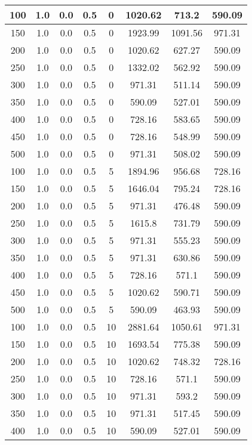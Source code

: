 \documentclass[a4paper, 12pt]{extreport}
\begin{document}
\begin{itemize}
\begin{longtable}{|c|c|c|c|c|c|c|c|}
			100 & 1.0 & 0.0 & 0.5 & 0 & 1020.62 & 713.2 & 590.09 \\\hline
			150 & 1.0 & 0.0 & 0.5 & 0 & 1923.99 & 1091.56 & 971.31 \\\hline
			200 & 1.0 & 0.0 & 0.5 & 0 & 1020.62 & 627.27 & 590.09 \\\hline
			250 & 1.0 & 0.0 & 0.5 & 0 & 1332.02 & 562.92 & 590.09 \\\hline
			300 & 1.0 & 0.0 & 0.5 & 0 & 971.31 & 511.14 & 590.09 \\\hline
			350 & 1.0 & 0.0 & 0.5 & 0 & 590.09 & 527.01 & 590.09 \\\hline
			400 & 1.0 & 0.0 & 0.5 & 0 & 728.16 & 583.65 & 590.09 \\\hline
			450 & 1.0 & 0.0 & 0.5 & 0 & 728.16 & 548.99 & 590.09 \\\hline
			500 & 1.0 & 0.0 & 0.5 & 0 & 971.31 & 508.02 & 590.09 \\\hline
			100 & 1.0 & 0.0 & 0.5 & 5 & 1894.96 & 956.68 & 728.16 \\\hline
			150 & 1.0 & 0.0 & 0.5 & 5 & 1646.04 & 795.24 & 728.16 \\\hline
			200 & 1.0 & 0.0 & 0.5 & 5 & 971.31 & 476.48 & 590.09 \\\hline
			250 & 1.0 & 0.0 & 0.5 & 5 & 1615.8 & 731.79 & 590.09 \\\hline
			300 & 1.0 & 0.0 & 0.5 & 5 & 971.31 & 555.23 & 590.09 \\\hline
			350 & 1.0 & 0.0 & 0.5 & 5 & 971.31 & 630.86 & 590.09 \\\hline
			400 & 1.0 & 0.0 & 0.5 & 5 & 728.16 & 571.1 & 590.09 \\\hline
			450 & 1.0 & 0.0 & 0.5 & 5 & 1020.62 & 590.71 & 590.09 \\\hline
			500 & 1.0 & 0.0 & 0.5 & 5 & 590.09 & 463.93 & 590.09 \\\hline
			100 & 1.0 & 0.0 & 0.5 & 10 & 2881.64 & 1050.61 & 971.31 \\\hline
			150 & 1.0 & 0.0 & 0.5 & 10 & 1693.54 & 775.38 & 590.09 \\\hline
			200 & 1.0 & 0.0 & 0.5 & 10 & 1020.62 & 748.32 & 728.16 \\\hline
			250 & 1.0 & 0.0 & 0.5 & 10 & 728.16 & 571.1 & 590.09 \\\hline
			300 & 1.0 & 0.0 & 0.5 & 10 & 971.31 & 593.2 & 590.09 \\\hline
			350 & 1.0 & 0.0 & 0.5 & 10 & 971.31 & 517.45 & 590.09 \\\hline
			400 & 1.0 & 0.0 & 0.5 & 10 & 590.09 & 527.01 & 590.09 \\\hline

\end{longtable}
\end{itemize}
\end{document}

